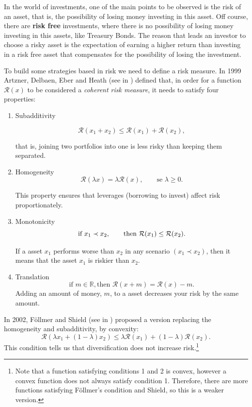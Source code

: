 In the world of investments, one of the main points to be observed is the risk of an asset, that is, the possibility of losing money investing in this asset. Off course, there are \textbf{risk free} investments, where there is no possibility of losing money investing in this assets, like Treasury Bonds. The reason that leads an investor to choose a risky asset is the expectation of earning a higher return than investing in a risk free asset that compensates for the possibility of losing the investment.


To build some strategies based in risk we need to define a risk measure. In 1999 Artzner, Delbaen, Eber and Heath (see in \cite{Artzner1999}) defined that,
in order for a function $\mathcal{R}(x)$ to be considered a \emph{coherent risk measure}, it needs to satisfy four
properties:

\begin{enumerate}
\item Subadditivity

\[
\mathcal{R}(x_1+x_2) \leq \mathcal{R}(x_1) + \mathcal{R}(x_2),
\]

that is, joining two portfolios into one is less risky than keeping them
separated.


\item Homogeneity
\[
\mathcal{R}(\lambda x) = \lambda \mathcal{R}(x), \qquad \mbox{se } \lambda
\geq 0.
\]

This property ensures that leverages (borrowing to invest) affect risk proportionately.

\item Monotonicity
\[
\mbox{if } x_1 \prec x_2, \qquad \mbox{then } \mathcal{R}(x_1) \leq \mathcal{R}(x_2).\\
\]

If a asset $x_1$ performs worse than $x_2$ in any
scenario $(x_1 \prec x_2)$, then it means that the asset $x_1$ is
riskier than $x_2$.

\item Translation
\[
\mbox{if } m\in\mathbb{R}, \mbox{then } \mathcal{R}(x+m) = \mathcal{R}(x)-m.
\]
Adding an amount of money, $m$, to a asset decreases your risk by the same amount.
\end{enumerate}


In 2002, Föllmer and Shield (see in \cite{Follmer2002}) proposed a version replacing the
homogeneity and subadditivity, by convexity:
\[
\mathcal{R}(\lambda x_1 + (1-\lambda)x_2) \leq \lambda \mathcal{R}(x_1) + (1-\lambda) \mathcal{R}(x_2).
\]
This condition tells us that diversification does not increase risk.\footnote{Note that a function satisfying conditions 1 and 2 is convex, however a convex function does not always satisfy condition 1. Therefore, there are more functions satisfying Föllmer's condition and Shield, so this is a weaker version.}

